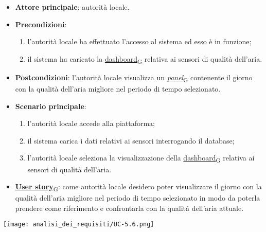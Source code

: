 \begin{itemize}
	\item \textbf{Attore principale}: autorità locale.
	\item \textbf{Precondizioni}:
	      \begin{enumerate}
		      \item l'autorità locale ha effettuato l'accesso al sistema ed esso è in funzione;
		      \item il sistema ha caricato la \href{https://7last.github.io/docs/pb/documentazione-interna/glossario\#dashboard}{dashboard\textsubscript{G}} relativa ai sensori di qualità dell'aria.
	      \end{enumerate}
	\item \textbf{Postcondizioni}: l'autorità locale visualizza un \href{https://7last.github.io/docs/pb/documentazione-interna/glossario\#panel}{\textit{panel}\textsubscript{G}} contenente il giorno con la qualità dell'aria migliore nel periodo di tempo selezionato.
	\item \textbf{Scenario principale}:
	      \begin{enumerate}
		      \item l'autorità locale accede alla piattaforma;
		      \item il sistema carica i dati relativi ai sensori interrogando il database;
		      \item l'autorità locale seleziona la visualizzazione della \href{https://7last.github.io/docs/pb/documentazione-interna/glossario\#dashboard}{dashboard\textsubscript{G}} relativa ai sensori di qualità dell'aria.
	      \end{enumerate}
	\item \href{https://7last.github.io/docs/pb/documentazione-interna/glossario\#user-story}{\textbf{User story}\textsubscript{G}}:
	      come autorità locale desidero poter visualizzare il giorno con la qualità dell'aria migliore nel periodo di tempo selezionato
	      in modo da poterla prendere come riferimento e confrontarla con la qualità dell'aria attuale.
\end{itemize}
\begin{center}
	\texttt{[image: analisi\_dei\_requisiti/UC-5.6.png]}
\end{center}

